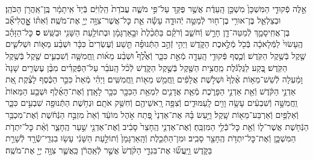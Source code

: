 \documentclass[twoside, openany, parskip=half, 11pt]{book}
\begin{document}
\begin{sometimes}
\begin{footnotesize}
\begin{multicols}{2}
\\
אֵ֣לֶּה פְֿקוּדֵ֤י הַמִּשְׁכָּן֙ מִשְׁכַּ֣ן הָֽעֵדֻ֔ת אֲשֶׁ֥ר פֻּקַּ֖ד עַל־פִּ֣י מֹשֶׁ֑ה עֲבֹדַת֙ הַֽלְוִיִּ֔ם בְּֿיַד֙ אִֽיתָמָ֔ר בֶּֽן־אַֽהֲרֹ֖ן הַכֹּהֵֽן׃ וּבְצַלְאֵ֛ל בֶּן־אוּרִ֥י בֶן־ח֖וּר לְֿמַטֵּ֣ה יְֿהוּדָ֑ה עָשָׂ֕ה אֵ֛ת כׇּל־אֲשֶׁר־צִוָּ֥ה יְיָ֖ אֶת־מֹשֶֽׁה׃ וְֿאִתּ֗וֹ אׇׇׇׇׇׇׇׇׇׇׇׇׇׇׇׇׇׇָֽהֳלִיאָ֞ב בֶּן־אֲחִֽיסָמָ֛ךְ לְֿמַטֵּה־דָ֖ן חָרָ֣שׁ וְֿחֹשֵׁ֑ב וְֿרֹקֵ֗ם בַּתְּֿכֵ֨לֶת֙ וּבָ֣אַרְגָּמָ֔ן וּבְתוֹלַ֥עַת הַשָּׁנִ֖י וּבַשֵּֽׁשׁ׃ \textbf{ס}  כׇּל־הַזָּהָ֗ב הֶֽעָשׂוּי֙ לַמְּֿלָאכָ֔ה בְּֿכֹ֖ל מְֿלֶ֣אכֶת הַקֹּ֑דֶשׁ וַיְהִ֣י זְֿהַ֣ב הַתְּֿנוּפָ֗ה תֵּ֤שַׁע וְֿעֶשְׂרִים֙ כִּכָּ֔ר וּשְׁבַ֨ע מֵא֧וֹת וּשְׁלֹשִׁ֛ים שֶׁ֖קֶל בְּֿשֶׁ֥קֶל הַקֹּֽדֶשׁ׃ וְֿכֶ֛סֶף פְּֿקוּדֵ֥י הָֽעֵדָ֖ה מְֿאַ֣ת כִּכָּ֑ר וְֿאֶ֩לֶף֩ וּשְׁבַ֨ע מֵא֜וֹת וַֽחֲמִשָּׁ֧ה וְֿשִׁבְעִ֛ים שֶׁ֖קֶל בְּֿשֶׁ֥קֶל הַקֹּֽדֶשׁ׃ בֶּ֚קַע לַגֻּלְגֹּ֔לֶת מַֽחֲצִ֥ית הַשֶּׁ֖קֶל בְּֿשֶׁ֣קֶל הַקֹּ֑דֶשׁ לְֿכֹ֨ל הָֽעֹבֵ֜ר עַל־הַפְּֿקֻדִ֗ים מִבֶּ֨ן עֶשְׂרִ֤ים שָׁנָה֙ וָמַ֔עְלָה לְֿשֵׁשׁ־מֵא֥וֹת אֶ֨לֶף֙ וּשְׁלֹ֣שֶׁת אֲלָפִ֔ים וַֽחֲמֵ֥שׁ מֵא֖וֹת וַֽחֲמִשִּֽׁים׃ וַיְהִ֗י מְֿאַת֙ כִּכַּ֣ר הַכֶּ֔סֶף לָצֶ֗קֶת אֵ֚ת אַדְנֵ֣י הַקֹּ֔דֶשׁ וְֿאֵ֖ת אַדְנֵ֣י הַפָּרֹ֑כֶת מְֿאַ֧ת אֲדָנִ֛ים לִמְאַ֥ת הַכִּכָּ֖ר כִּכָּ֥ר לָאָֽדֶן׃  וְֿאֶת־הָאֶ֜לֶף וּשְׁבַ֤ע הַמֵּאוֹת֙ וַֽחֲמִשָּׁ֣ה וְֿשִׁבְעִ֔ים עָשָׂ֥ה וָוִ֖ים לָֽעַמּוּדִ֑ים וְֿצִפָּ֥ה רָֽאשֵׁיהֶ֖ם וְֿחִשַּׁ֥ק אֹתָֽם׃ וּנְחֹ֥שֶׁת הַתְּֿנוּפָ֖ה שִׁבְעִ֣ים כִּכָּ֑ר וְֿאַלְפַּ֥יִם וְֿאַרְבַּע־מֵא֖וֹת שָֽׁקֶל׃ וַיַּ֣עַשׂ בָּ֗הּ אֶת־אַדְנֵי֙ פֶּ֚תַח אֹ֣הֶל מוֹעֵ֔ד וְֿאֵת֙ מִזְבַּ֣ח הַנְּֿחֹ֔שֶׁת וְֿאֶת־מִכְבַּ֥ר הַנְּֿחֹ֖שֶׁת אֲשֶׁר־ל֑וֹ וְֿאֵ֖ת כׇּל־כְּֿֿלֵ֥י הַמִּזְבֵּֽחַ׃ וְֿאֶת־אַדְנֵ֤י הֶֽחָצֵר֙ סָבִ֔יב וְֿאֶת־אַדְנֵ֖י שַׁ֣עַר הֶֽחָצֵ֑ר וְֿאֵ֨ת כׇּל־יִתְדֹ֧ת הַמִּשְׁכָּ֛ן וְֿאֶת־כׇּל־יִתְדֹ֥ת הֶֽחָצֵ֖ר סָבִֽיב׃ וּמִן־הַתְּֿכֵ֤לֶת וְֿהָֽאַרְגָּמָן֙ וְֿתוֹלַ֣עַת הַשָּׁנִ֔י עָשׂ֥וּ בִגְדֵֽי־שְֿֿׂרָ֖ד לְֿשָׁרֵ֣ת בַּקֹּ֑דֶשׁ וַֽיַּֽעֲשׂ֞וּ אֶת־בִּגְדֵ֤י הַקֹּ֨דֶשׁ֙ אֲשֶׁ֣ר לְֿאַֽהֲרֹ֔ן כַּֽאֲשֶׁ֛ר צִוָּ֥ה יְיָ֖ אֶת־מֹשֶֽׁה׃


\end{multicols}
\end{footnotesize}
\end{sometimes}
\end{document}
